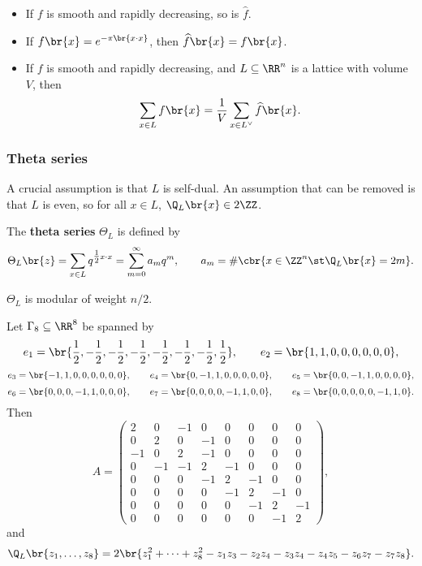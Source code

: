 \begin{fact*}
\hfill
\begin{itemize}
\item If $ f $ is smooth and rapidly decreasing, so is $ \widehat{f} $.
\item If $ f\br{x} = e^{-\pi\br{x \cdot x}} $, then $ \widehat{f}\br{x} = f\br{x} $.
\item If $ f $ is smooth and rapidly decreasing, and $ L \subseteq \RR^n $ is a lattice with volume $ V $, then
$$ \sum_{x \in L} f\br{x} = \dfrac{1}{V}\sum_{x \in L^\vee} \widehat{f}\br{x}. $$
\end{itemize}
\end{fact*}

\subsubsection{Theta series}

A crucial assumption is that $ L $ is self-dual. An assumption that can be removed is that $ L $ is even, so for all $ x \in L $, $ \Q_L\br{x} \in 2\ZZ $.

\begin{definition}
The \textbf{theta series} $ \Theta_L $ is defined by
$$ \Theta_L\br{z} = \sum_{x \in L} q^{\tfrac{1}{2}x \cdot x} = \sum_{m = 0}^\infty a_mq^m, \qquad a_m = \#\cbr{x \in \ZZ^n \st \Q_L\br{x} = 2m}. $$
\end{definition}

\begin{theorem}
\label{thm:thetaseries}
$ \Theta_L $ is modular of weight $ n / 2 $.
\end{theorem}

\begin{example*}
Let $ \Gamma_8 \subseteq \RR^8 $ be spanned by
$$ e_1 = \br{\dfrac{1}{2}, -\dfrac{1}{2}, -\dfrac{1}{2}, -\dfrac{1}{2}, -\dfrac{1}{2}, -\dfrac{1}{2}, -\dfrac{1}{2}, \dfrac{1}{2}}, \qquad e_2 = \br{1, 1, 0, 0, 0, 0, 0, 0}, $$
$$ e_3 = \br{-1, 1, 0, 0, 0, 0, 0, 0}, \qquad e_4 = \br{0, -1, 1, 0, 0, 0, 0, 0}, \qquad e_5 = \br{0, 0, -1, 1, 0, 0, 0, 0}, $$
$$ e_6 = \br{0, 0, 0, -1, 1, 0, 0, 0}, \qquad e_7 = \br{0, 0, 0, 0, -1, 1, 0, 0}, \qquad e_8 = \br{0, 0, 0, 0, 0, -1, 1, 0}. $$
Then
$$ A =
\begin{pmatrix}
2 & 0 & -1 & 0 & 0 & 0 & 0 & 0 \\
0 & 2 & 0 & -1 & 0 & 0 & 0 & 0 \\
-1 & 0 & 2 & -1 & 0 & 0 & 0 & 0 \\
0 & -1 & -1 & 2 & -1 & 0 & 0 & 0 \\
0 & 0 & 0 & -1 & 2 & -1 & 0 & 0 \\
0 & 0 & 0 & 0 & -1 & 2 & -1 & 0 \\
0 & 0 & 0 & 0 & 0 & -1 & 2 & -1 \\
0 & 0 & 0 & 0 & 0 & 0 & -1 & 2
\end{pmatrix},
$$
and
$$ \Q_L\br{z_1, \dots, z_8} = 2\br{z_1^2 + \dots + z_8^2 - z_1z_3 - z_2z_4 - z_3z_4 - z_4z_5 - z_6z_7 - z_7z_8}. $$
\end{example*}

